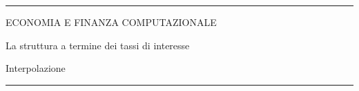 \documentclass[12pt,aspectratio=169]{beamer}
\begin{document}
\begin{frame}
\unitlength 5mm

\begin{center}

\rule{\textwidth}{2pt}

\vskip3mm
ECONOMIA E FINANZA COMPUTAZIONALE

La struttura a termine dei tassi di interesse

Interpolazione
\rule{\textwidth}{2pt}

\end{center}

\end{frame}


\end{document}
